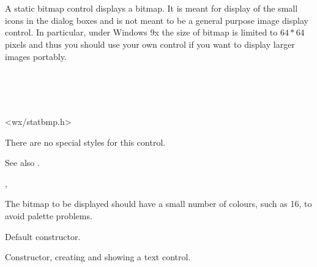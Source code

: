 \section{}\label{wxstaticbitmap}

A static bitmap control displays a bitmap. It is meant for display of the
small icons in the dialog boxes and is not meant to be a general purpose image
display control. In particular, under Windows 9x the size of bitmap is limited
to $64*64$ pixels and thus you should use your own control if you want to
display larger images portably.


\\
\\
\\


<wx/statbmp.h>


There are no special styles for this control.

See also .


, 


The bitmap to be displayed should have a small number of colours, such as 16, to avoid
palette problems.



\label{wxstaticbitmapconstr}


Default constructor.


Constructor, creating and showing a text control.



